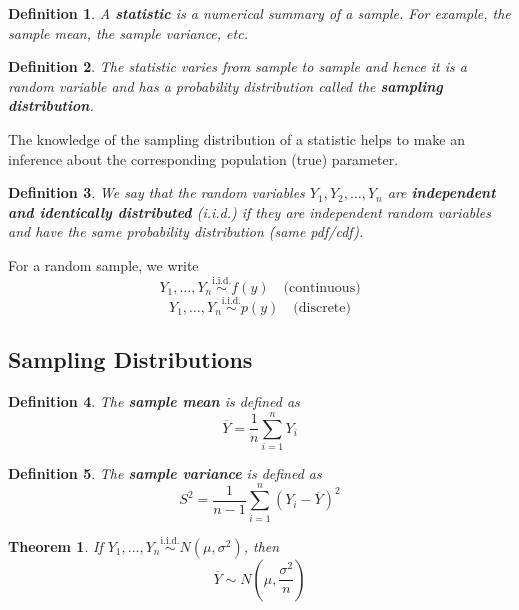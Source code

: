 \documentclass[a4paper,12pt]{article}
\theoremstyle{nonitalic}
\newtheorem{definition}{Definition}[subsection]
\newtheorem{theorem}{Theorem}[subsection]
\begin{document}
    \begin{definition}
        A \textbf{statistic} is a numerical summary of a sample. For example, the sample mean, the sample variance, etc.
    \end{definition}

    \begin{definition}
        The statistic varies from sample to sample and hence it is a random variable and has a probability distribution called the \textbf{sampling distribution}.
    \end{definition}

    The knowledge of the sampling distribution of a statistic helps to make an inference about the corresponding population (true) parameter.

    \begin{definition}
        We say that the random variables $Y_1, Y_2, \ldots, Y_n$ are \textbf{independent and identically distributed} (i.i.d.) if they are independent random variables and have the same probability distribution (same pdf/cdf).
    \end{definition}

    For a random sample, we write
    \[
        Y_1, \ldots, Y_n \overset{\text{i.i.d.}}{\sim} f(y) \quad \text{(continuous)}
    \]
    \[
        Y_1, \ldots, Y_n \overset{\text{i.i.d.}}{\sim} p(y) \quad \text{(discrete)}
    \]
    \newpage

    \subsection{Sampling Distributions}
    
    \begin{definition}
        The \textbf{sample mean} is defined as
        \[
            \overline{Y} = \frac{1}{n} \sum_{i=1}^{n} Y_i
        \]
    \end{definition}

    \begin{definition}
        The \textbf{sample variance} is defined as
        \[
            S^2 = \frac{1}{n-1} \sum_{i=1}^{n} (Y_i - \overline{Y})^2
        \]
    \end{definition}

    \begin{theorem}
        If $Y_1, \ldots, Y_n \overset{\text{i.i.d.}}{\sim} N\left(\mu, \sigma^2\right)$, then
        \[
        \overline{Y} \sim N\left(\mu, \frac{\sigma^2}{n}\right)
        \]
    \end{theorem}
    
\end{document}
